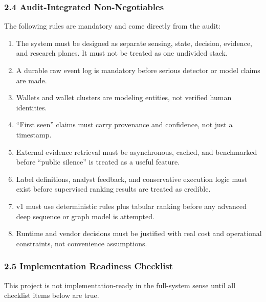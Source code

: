 \documentclass[
]{article}
\providecommand{\tightlist}{%
  \setlength{\itemsep}{0pt}\setlength{\parskip}{0pt}}
\begin{document}
\subsubsection{2.4 Audit-Integrated Non-Negotiables}\label{24-audit-integrated-non-negotiables}

The following rules are mandatory and come directly from the audit:

\begin{enumerate}
\def\labelenumi{\arabic{enumi}.}
\tightlist
\item
  The system must be designed as separate sensing, state, decision,
  evidence, and research planes. It must not be treated as one undivided
  stack.
\item
  A durable raw event log is mandatory before serious detector or model
  claims are made.
\item
  Wallets and wallet clusters are modeling entities, not verified human
  identities.
\item
  ``First seen'' claims must carry provenance and confidence, not just a
  timestamp.
\item
  External evidence retrieval must be asynchronous, cached, and
  benchmarked before ``public silence'' is treated as a useful feature.
\item
  Label definitions, analyst feedback, and conservative execution logic
  must exist before supervised ranking results are treated as credible.
\item
  v1 must use deterministic rules plus tabular ranking before any
  advanced deep sequence or graph model is attempted.
\item
  Runtime and vendor decisions must be justified with real cost and
  operational constraints, not convenience assumptions.
\end{enumerate}

\subsubsection{2.5 Implementation Readiness Checklist}\label{25-implementation-readiness-checklist}

This project is not implementation-ready in the full-system sense until
all checklist items below are true.
\end{document}
